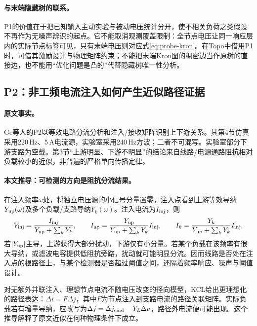\documentclass[UTF8,11pt,fontset=fandol]{ctexart}
\theoremstyle{remark}
\numberwithin{equation}{section}
\begin{document}
\paragraph{与末端隐藏树的联系。}
P1的价值在于把已知输入主动实验与被动电压统计分开，使不相关负荷之类假设不再作为无噪声辨识的起点。它不能取消观测覆盖限制：全节点电压让同一响应层内的实际节点标签可见，只有末端电压则对应式\eqref{eq:probe-kron}。在Topo中借用P1时，可借其激励设计与物理矩阵约束；不能把末端Kron图的稠密边当作原树的直接边，也不能用“优化问题是凸的”代替隐藏树唯一性分析。

\subsection{P2：非工频电流注入如何产生近似路径证据}
\label{subsec:P2}

\paragraph{原文事实。}
Ge等人的P2\citep{P2}以等效电路分流分析和注入/接收矩阵识别上下游关系。其第4节仿真采用220\,Hz、5\,A电流源，实验室采用240\,Hz方波；二者不可混写。实验室部分下游支路为空载。第3节“上游明显、下游不明显”的结论来自线路/电源通路阻抗相对负载较小的近似，非普遍的严格单向传播定律。

\paragraph{本文推导：可检测的方向是阻抗分流结果。}
在注入频率$\omega$处，将独立电压源的小信号分量置零，注入点看到上游等效导纳$Y_{\rm up}(\omega)$及多个负载/支路导纳$Y_k(\omega)$。注入电流为$I_{\rm inj}$，则
\begin{equation}
 V_{\rm inj}=\frac{I_{\rm inj}}{Y_{\rm up}+\sum_kY_k},\qquad
 I_{\rm up}=\frac{Y_{\rm up}}{Y_{\rm up}+\sum_kY_k}I_{\rm inj},\qquad
 I_k=\frac{Y_k}{Y_{\rm up}+\sum_kY_k}I_{\rm inj}.
 \label{eq:p2-current-split}
\end{equation}
若$|Y_{\rm up}|$主导，上游获得大部分扰动，下游仅有小分量。若某个负载在该频率有很大导纳，或滤波电容提供低阻抗旁路，扰动就可能明显分流。因而线路是否处在注入点的根路径上，与某个检测器是否超过阈值之间，还隔着频率响应、噪声与阈值设计。

对无额外并联注入、理想节点电流不随电压改变的径向模型，KCL给出更理想化的路径表达：$\Delta i=F\Delta j$，其中$F$为节点注入到支路电流的路径关联矩阵。实际负载若有增量导纳，应改写为$\Delta j=\Delta j_{\rm cmd}-Y_L\Delta v$，路径外电流便可能出现。这个推导解释了原文近似在何种物理条件下成立。
\end{document}
